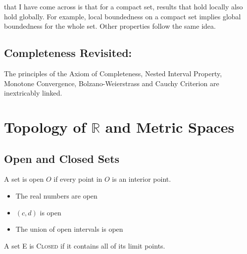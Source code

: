\documentclass{tufte-book}
\theoremstyle{definition}
\numberwithin{section}{chapter}
\begin{document}


 that I have come across is that for a compact set, results that hold locally also hold globally.
For example, local boundedness on a compact set implies global boundedness for the whole set.
Other properties follow the same idea.


\subsection{Completeness Revisited:}

The principles of the Axiom of Completeness, Nested Interval Property, Monotone Convergence, Bolzano-Weierstrass and Cauchy Criterion are inextricably linked.

\section{Topology of $\mathbb{R}$ and Metric Spaces}
\subsection{Open and Closed Sets}
 A set is open $O$ if every point in $O$ is an interior point.
		\begin{itemize}
			\item The real numbers are open
			\item $(c,d)$ is open
			\item The union of open intervals is open
		\end{itemize}


 A set E is \textsc{Closed} if it contains all of its limit points.
	
\end{document}
